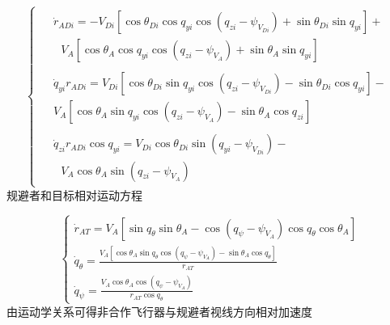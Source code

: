 \begin{equation}
\label{eq:1}
\left\{ {\begin{array}{*{20}{l}}
  \begin{aligned}
& {{\dot r}_{ADi}} =  - {V_{Di}}\left[ {\cos {\theta _{Di}}\cos {q_{yi}}\cos \left( {{q_{zi}} - {\psi _{{V_{Di}}}}} \right) + \sin {\theta _{Di}}\sin {q_{yi}}} \right] +  \\
& {\text{   }}{V_A}\left[ {\cos {\theta _A}\cos {q_{yi}}\cos \left( {{q_{zi}} - {\psi _{{V_A}}}} \right) + \sin {\theta _A}\sin {q_{yi}}} \right]
\end{aligned} \\
  \begin{aligned}
& {{\dot q}_{yi}}{r_{ADi}} = {V_{Di}}\left[ {\cos {\theta _{Di}}\sin {q_{yi}}\cos \left( {{q_{zi}} - {\psi _{{V_{Di}}}}} \right) - \sin {\theta _{Di}}\cos {q_{yi}}} \right] -  \\
& {V_A}\left[ {\cos {\theta _A}\sin {q_{yi}}\cos \left( {{q_{zi}} - {\psi _{{V_A}}}} \right) - \sin {\theta _A}\cos {q_{zi}}} \right]
\end{aligned} \\
  \begin{aligned}
& {{\dot q}_{zi}}{r_{ADi}}\cos {q_{yi}} = {V_{Di}}\cos {\theta _{Di}}\sin \left( {{q_{yi}} - {\psi _{{V_{Di}}}}} \right) -  \\
& {\text{           }}{V_A}\cos {\theta _A}\sin \left( {{q_{zi}} - {\psi _{{V_A}}}} \right)
\end{aligned}
\end{array}} \right.
\end{equation}
规避者和目标相对运动方程

\begin{equation}
\label{eq:2}
\left\{ {\begin{array}{*{20}{l}}
  {{{\dot r}_{AT}} = {V_A}\left[ {\sin {q_\theta }\sin {\theta _A} - \cos \left( {{q_\psi } - {\psi _{{V_A}}}} \right)\cos {q_\theta }\cos {\theta _A}} \right]} \\ 
  {{{\dot q}_\theta } = \frac{{{V_A}\left[ {\cos {\theta _A}\sin {q_\theta }\cos \left( {{q_\psi } - {\psi _{{V_A}}}} \right) - \sin {\theta _A}\cos {q_\theta }} \right]}}{{{r_{AT}}}}} \\ 
  {{{\dot q}_\psi } = \frac{{{V_A}\cos {\theta _A}\cos \left( {{q_\psi } - {\psi _{{V_A}}}} \right)}}{{{r_{AT}}\cos {q_\theta }}}} 
\end{array}} \right.
\end{equation}
由运动学关系可得非合作飞行器与规避者视线方向相对加速度

